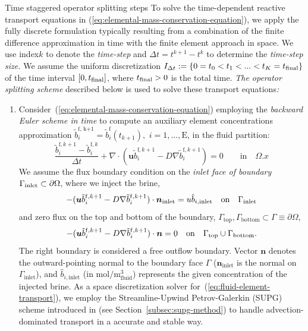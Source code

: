 \begin{frame}{Time staggered operator splitting steps}
	To solve the time-dependent reactive transport equations in (\ref{eq:elemental-mass-conservation-equation}),
	we apply the fully discrete formulation typically resulting from a
	combination of the finite difference approximation in time with the
	finite element approach in space. We use index$k$ to denote the \emph{time-step}
	and $\Delta t=t^{k+1}-t^{k}$ to determine the \emph{time-step size.
	}We assume the uniform discretization $I_{\ensuremath{\Delta t}}:=\{0=t_{0}<t_{1}<...<t_{K}=t_{{\rm final}}\}$
	of the time interval $[0,t_{{\rm final}}]$, where $t_{{\rm final}}>0$
	is the total time. \emph{The operator splitting scheme }described
	below is used to solve these transport equations\emph{:}
	\begin{enumerate}
		\item[\textbf{I.}] Consider~(\ref{eq:elemental-mass-conservation-equation}) employing
		the \emph{backward Euler scheme in time} to compute an auxiliary element
		concentrations approximation $\tilde{b}_{i}^{\text{f, k+1}}=\tilde{b}_{i}^{\text{f}}(t_{k+1}),$
		$i=1,\ldots,\text{E}$, in the fluid partition:
		\begin{equation}
			\frac{\tilde{b}_{i}^{\text{f},k+1}-\tilde{b}_{i}^{\text{f},k}}{\Delta t}+\nabla\cdot(\boldsymbol{u}\tilde{b}_{i}^{\text{f},k+1}-D\nabla\tilde{b}_{i}^{\text{f},k+1})=0\qquad\text{in}\quad\Omega.x\label{eq:fluid-element-transport}
		\end{equation}
		We assume the flux boundary condition on the \emph{inlet face of boundary}
		$\Gamma_{{\rm inlet}}\subset\partial\Omega$, where we inject the
		brine,
		\[
		-(\boldsymbol{u}\tilde{b}_{i}^{{\rm f},k+1}-D\nabla\tilde{b}_{i}^{{\rm f},k+1})\cdot\boldsymbol{n}_{\text{inlet}}=u\hat{b}_{i,\text{inlet}}\quad\text{on}\quad\Gamma_{\text{inlet}}
		\]
		and zero flux on the top and bottom of the boundary, $\Gamma_{\text{top}},\Gamma_{\text{bottom}}\subset\Gamma\equiv\partial\Omega$,
		\[
		-(\boldsymbol{u}\tilde{b}_{i}^{{\rm f},k+1}-D\nabla\tilde{b}_{i}^{{\rm f},k+1})\cdot\textbf{\emph{\ensuremath{\boldsymbol{n}}}}=0\quad\text{on}\quad\Gamma_{\text{top}}\cup\Gamma_{\text{bottom}}.
		\]
		The right boundary is considered a free outflow boundary. Vector $\boldsymbol{n}$
		denotes the outward-pointing normal to the boundary face $\Gamma$
		($\boldsymbol{n}_{\text{inlet}}$ is the normal on $\Gamma_{\text{inlet}}$),
		and $\hat{b}_{i,\text{inlet}}$ (in $\mathrm{mol/m_{\mathrm{fluid}}^{3}}$)
		represents the given concentration of the injected brine. As a space
		discretization solver for~(\ref{eq:fluid-element-transport}), we
		employ the Streamline-Upwind Petrov-Galerkin (SUPG) scheme introduced
		in \citet{BrooksHughes} (see Section~\ref{subsec:supg-method})
		to handle advection-dominated transport in a accurate and stable way.
		

\end{enumerate}
\end{frame}
